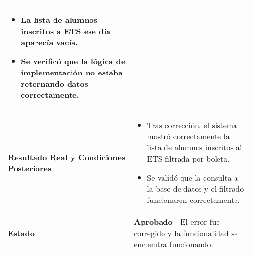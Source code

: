 \begin{longtable}{|p{5cm}|p{10cm}|}
\begin{itemize}
		\item La lista de alumnos inscritos a ETS ese día aparecía vacía.
		\item Se verificó que la lógica de implementación no estaba retornando datos correctamente.
	\end{itemize} \\
	\hline
	\textbf{Resultado Real y Condiciones Posteriores} & 
	\begin{itemize}
		\item Tras corrección, el sistema mostró correctamente la lista de alumnos inscritos al ETS filtrada por boleta.
		\item Se validó que la consulta a la base de datos y el filtrado funcionaron correctamente.
	\end{itemize} \\
	\hline
	\textbf{Estado} & 
	\textbf{Aprobado} - El error fue corregido y la funcionalidad se encuentra funcionando. \\
	\hline
\end{longtable}